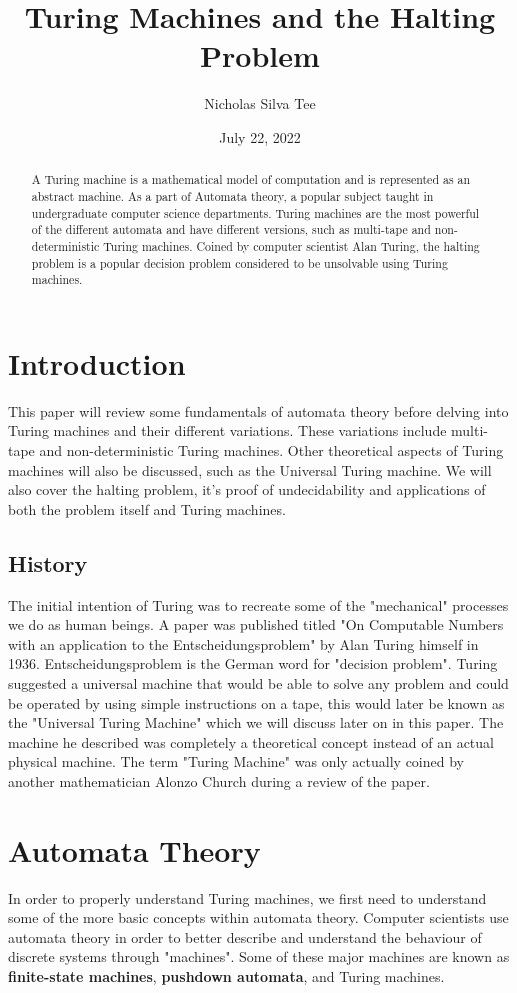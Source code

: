 \documentclass[12pt, letterpaper]{article}
\title{Turing Machines and the Halting Problem}
\date{July 22, 2022}
\author{Nicholas Silva Tee}
\begin{document}
\maketitle
\begin{abstract}
A Turing machine is a mathematical model of computation and is represented as an abstract machine. As a part of Automata theory, a popular subject taught in undergraduate computer science departments. Turing machines are the most powerful of the different automata and have different versions, such as multi-tape and non-deterministic Turing machines. Coined by computer scientist Alan Turing, the halting problem is a popular decision problem considered to be unsolvable using Turing machines.
\end{abstract}

\section{Introduction}
This paper will review some fundamentals of automata theory before delving into Turing machines and their different variations. These variations include multi-tape and non-deterministic Turing machines. Other theoretical aspects of Turing machines will also be discussed, such as the Universal Turing machine. We will also cover the halting problem, it's proof of undecidability and applications of both the problem itself and Turing machines.




\subsection{History}
The initial intention of Turing was to recreate some of the "mechanical" processes we do as human beings. A paper was published titled "On Computable Numbers with an application to the Entscheidungsproblem" by Alan Turing himself in 1936. Entscheidungsproblem is the German word for "decision problem".\cite{brod} Turing suggested a universal machine that would be able to solve any problem and could be operated by using simple instructions on a tape, this would later be known as the "Universal Turing Machine" which we will discuss later on in this paper. The machine he described was completely a theoretical concept instead of an actual physical machine. The term "Turing Machine" was only actually coined by another mathematician Alonzo Church during a review of the paper.




\newpage
\section{Automata Theory}
In order to properly understand Turing machines, we first need to understand some of the more basic concepts within automata theory. Computer scientists use automata theory in order to better describe and understand the behaviour of discrete systems through "machines". Some of these major machines are known as \textbf{finite-state machines}, \textbf{pushdown automata}, and Turing machines.\\
\end{document}
